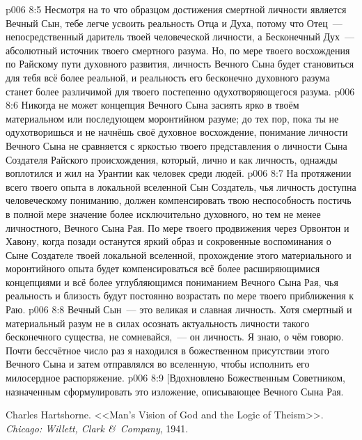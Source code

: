 \vs p006 8:5 \pc Несмотря на то что образцом достижения смертной личности является Вечный Сын, тебе легче усвоить реальность Отца и Духа, потому что Отец~--- непосредственный даритель твоей человеческой личности, а Бесконечный Дух~--- абсолютный источник твоего смертного разума. Но, по мере твоего восхождения по Райскому пути духовного развития, личность Вечного Сына будет становиться для тебя всё более реальной, и реальность его бесконечно духовного разума станет более различимой для твоего постепенно одухотворяющегося разума.
\vs p006 8:6 Никогда не может концепция Вечного Сына засиять ярко в твоём материальном или последующем моронтийном разуме; до тех пор, пока ты не одухотворишься и не начнёшь своё духовное восхождение, понимание личности Вечного Сына не сравняется с яркостью твоего представления о личности Сына Создателя Райского происхождения, который, лично и как личность, однажды воплотился и жил на Урантии как человек среди людей.
\vs p006 8:7 На протяжении всего твоего опыта в локальной вселенной Сын Создатель, чья личность доступна человеческому пониманию, должен компенсировать твою неспособность постичь в полной мере значение более исключительно духовного, но тем не менее личностного, Вечного Сына Рая. По мере твоего продвижения через Орвонтон и Хавону, когда позади останутся яркий образ и сокровенные воспоминания о Сыне Создателе твоей локальной вселенной, прохождение этого материального и моронтийного опыта будет компенсироваться всё более расширяющимися концепциями и всё более углубляющимся пониманием Вечного Сына Рая, чья реальность и близость будут постоянно возрастать по мере твоего приближения к Раю.
\vs p006 8:8 \pc Вечный Сын~--- это великая и славная личность. Хотя смертный и материальный разум не в силах осознать актуальность личности такого бесконечного существа, не сомневайся,~--- он личность. Я знаю, о чём говорю. Почти бессчётное число раз я находился в божественном присутствии этого Вечного Сына и затем отправлялся во вселенную, чтобы исполнить его милосердное распоряжение.
\vsetoff
\vs p006 8:9 [Вдохновлено Божественным Советником, назначенным сформулировать это изложение, описывающее Вечного Сына Рая.
\quizlink
\begin{thebibliography}{100}
Charles Hartshorne.
{<<Man's Vision of God and the Logic of Theism>>.}
{\em Chicago: Willett, Clark \&\ Company}, 1941.
\end{thebibliography}
